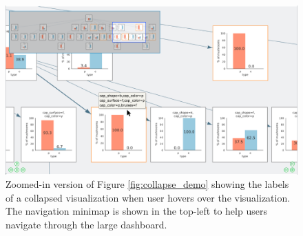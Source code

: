 \begin{figure}[ht!]
\centering
\includegraphics[width=\linewidth]{figures/minimap_zoom.png}
\caption{Zoomed-in version of Figure \ref{fig:collapse_demo} showing the labels of a collapsed visualization when user hovers over the visualization. The navigation minimap is shown in the top-left to help users navigate through the large dashboard.}
\label{fig:hover_minimap}
\end{figure}